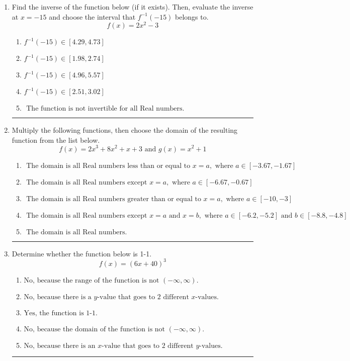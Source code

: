 \documentclass[14pt]{extbook}
\newcommand{\litem}[1]{\item#1\hspace*{-1cm}\rule{\textwidth}{0.4pt}}
\begin{document}
\begin{enumerate}
{\begin{enumerate}[label=\Alph*.]
\end{enumerate} }
\litem{
Find the inverse of the function below (if it exists). Then, evaluate the inverse at $x = -15$ and choose the interval that $f^{-1}(-15)$ belongs to.\[ f(x) = 2 x^2 - 3 \]\begin{enumerate}[label=\Alph*.]
\item \( f^{-1}(-15) \in [4.29, 4.73] \)
\item \( f^{-1}(-15) \in [1.98, 2.74] \)
\item \( f^{-1}(-15) \in [4.96, 5.57] \)
\item \( f^{-1}(-15) \in [2.51, 3.02] \)
\item \( \text{ The function is not invertible for all Real numbers. } \)

\end{enumerate} }
\litem{
Multiply the following functions, then choose the domain of the resulting function from the list below.\[ f(x) = 2x^{3} +8 x^{2} +x + 3 \text{ and } g(x) = x^{2} + 1 \]\begin{enumerate}[label=\Alph*.]
\item \( \text{ The domain is all Real numbers less than or equal to } x = a, \text{ where } a \in [-3.67, -1.67] \)
\item \( \text{ The domain is all Real numbers except } x = a, \text{ where } a \in [-6.67, -0.67] \)
\item \( \text{ The domain is all Real numbers greater than or equal to } x = a, \text{ where } a \in [-10, -3] \)
\item \( \text{ The domain is all Real numbers except } x = a \text{ and } x = b, \text{ where } a \in [-6.2, -5.2] \text{ and } b \in [-8.8, -4.8] \)
\item \( \text{ The domain is all Real numbers. } \)

\end{enumerate} }
\litem{
Determine whether the function below is 1-1.\[ f(x) = (6 x + 40)^3 \]\begin{enumerate}[label=\Alph*.]
\item \( \text{No, because the range of the function is not $(-\infty, \infty)$.} \)
\item \( \text{No, because there is a $y$-value that goes to 2 different $x$-values.} \)
\item \( \text{Yes, the function is 1-1.} \)
\item \( \text{No, because the domain of the function is not $(-\infty, \infty)$.} \)
\item \( \text{No, because there is an $x$-value that goes to 2 different $y$-values.} \)


\end{enumerate}}
\end{enumerate}
\end{document}
